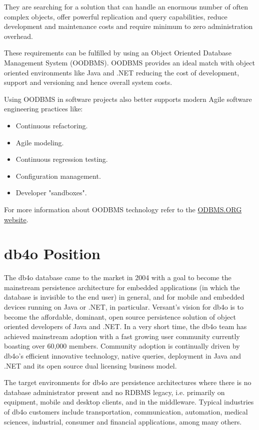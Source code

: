 They are searching for a solution that can handle an enormous number of often complex objects, offer powerful replication and query capabilities, reduce development and maintenance costs and require minimum to zero administration overhead.

These requirements can be fulfilled by using an Object Oriented Database Management System (OODBMS). OODBMS provides an ideal match with object oriented environments like Java and .NET reducing the cost of development, support and versioning and hence overall system costs.

Using OODBMS in software projects also better supports modern Agile software engineering practices like:

\begin{itemize}
\item Continuous refactoring.
\item Agile modeling.
\item Continuous regression testing.
\item Configuration management.
\item Developer "sandboxes".
\end{itemize}

For more information about OODBMS technology refer to the \href{http://www.odbms.org/}{ODBMS.ORG website}.

\section{db4o Position}
\label{ref:product-philosophy-db4o-position}

The db4o database came to the market in 2004 with a goal to become the mainstream persistence architecture for embedded applications (in which the database is invisible to the end user) in general, and for mobile and embedded devices running on Java or .NET, in particular. Versant's vision for db4o is to become the affordable, dominant, open source persistence solution of object oriented developers of Java and .NET. In a very short time, the db4o team has achieved mainstream adoption with a fast growing user community currently boasting over 60,000 members. Community adoption is continually driven by db4o's efficient innovative technology, native queries, deployment in Java and .NET and its open source dual licensing business model.

The target environments for db4o are persistence architectures where there is no database administrator present and no RDBMS legacy, i.e. primarily on equipment, mobile and desktop clients, and in the middleware. Typical industries of db4o customers include transportation, communication, automation, medical sciences, industrial, consumer and financial applications, among many others.

